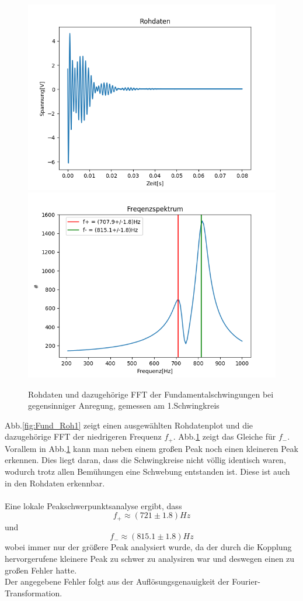 \documentclass[12pt,a4paper]{article}
\begin{document}
\begin{figure}
\begin{center}
\includegraphics[width=0.49\linewidth]{Bilder/Fund_Rohdaten2.PNG}
\includegraphics[width=0.49\linewidth]{Bilder/Fund_Frequenz2.PNG}
\end{center}
\caption[Aufbau Schwebung]{Rohdaten und dazugehörige FFT der Fundamentalschwingungen bei gegensinniger Anregung, gemessen am 1.Schwingkreis}
\label{fig:Fund_Roh2}
\end{figure}

Abb.\ref{fig:Fund_Roh1} zeigt einen ausgewählten Rohdatenplot und die dazugehörige FFT der niedrigeren Frequenz $f_+$. Abb.\ref{fig:Fund_Roh2} zeigt das Gleiche für $f_-$.\\
Vorallem in Abb.\ref{fig:Fund_Roh2} kann man neben einem großen Peak noch einen kleineren Peak erkennen. Dies liegt daran, dass die Schwingkreise nicht völlig identisch waren, wodurch trotz allen Bemühungen eine Schwebung entstanden ist.
Diese ist auch in den Rohdaten erkennbar.\\
\\
Eine lokale Peakschwerpunktsanalyse ergibt, dass
\begin{equation}
f_+ \approx (721\pm 1.8)Hz
\end{equation}
und
\begin{equation}
f_- \approx (815.1\pm 1.8)Hz
\end{equation}
wobei immer nur der größere Peak analysiert wurde, da der durch die Kopplung hervorgerufene kleinere Peak zu schwer zu analysiren war und deswegen einen zu großen Fehler hatte.\\
Der angegebene Fehler folgt aus der Auflösungsgenauigkeit der Fourier-Transformation.
\end{document}

